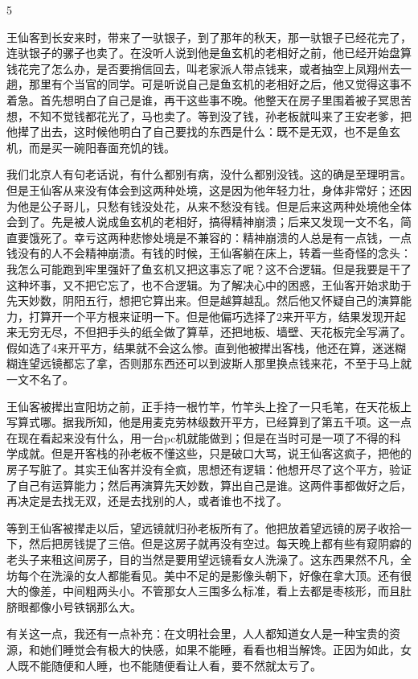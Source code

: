 5 

王仙客到长安来时，带来了一驮银子，到了那年的秋天，那一驮银子已经花完了，连驮银子的骡子也卖了。在没听人说到他是鱼玄机的老相好之前，他已经开始盘算钱花完了怎么办，是否要捎信回去，叫老家派人带点钱来，或者抽空上凤翔州去一趟，那里有个当官的同学。可是听说自己是鱼玄机的老相好之后，他又觉得这事不着急。首先想明白了自己是谁，再干这些事不晚。他整天在房子里围着被子冥思苦想，不知不觉钱都花光了，马也卖了。等到没了钱，孙老板就叫来了王安老爹，把他撵了出去，这时候他明白了自己要找的东西是什么：既不是无双，也不是鱼玄机，而是买一碗阳春面充饥的钱。 

我们北京人有句老话说，有什么都别有病，没什么都别没钱。这的确是至理明言。但是王仙客从来没有体会到这两种处境，这是因为他年轻力壮，身体非常好；还因为他是公子哥儿，只愁有钱没处花，从来不愁没有钱。但是后来这两种处境他全体会到了。先是被人说成鱼玄机的老相好，搞得精神崩溃；后来又发现一文不名，简直要饿死了。幸亏这两种悲惨处境是不兼容的：精神崩溃的人总是有一点钱，一点钱没有的人不会精神崩溃。有钱的时候，王仙客躺在床上，转着一些奇怪的念头：我怎么可能跑到牢里强奸了鱼玄机又把这事忘了呢？这不合逻辑。但是我要是干了这种坏事，又不把它忘了，也不合逻辑。为了解决心中的困惑，王仙客开始求助于先天妙数，阴阳五行，想把它算出来。但是越算越乱。然后他又怀疑自己的演算能力，打算开一个平方根来证明一下。但是他偏巧选择了2来开平方，结果发现开起来无穷无尽，不但把手头的纸全做了算草，还把地板、墙壁、天花板完全写满了。假如选了4来开平方，结果就不会这么惨。直到他被撵出客栈，他还在算，迷迷糊糊连望远镜都忘了拿，否则那东西还可以到波斯人那里换点钱来花，不至于马上就一文不名了。 

王仙客被撵出宣阳坊之前，正手持一根竹竿，竹竿头上拴了一只毛笔，在天花板上写算式哪。据我所知，他是用麦克劳林级数开平方，已经算到了第五千项。这一点在现在看起来没有什么，用一台pc机就能做到；但是在当时可是一项了不得的科学成就。但是开客栈的孙老板不懂这些，只是破口大骂，说王仙客这疯子，把他的房子写脏了。其实王仙客并没有全疯，思想还有逻辑：他想开尽了这个平方，验证了自己有运算能力；然后再演算先天妙数，算出自己是谁。这两件事都做好之后，再决定是去找无双，还是去找别的人，或者谁也不找了。 

等到王仙客被撵走以后，望远镜就归孙老板所有了。他把放着望远镜的房子收拾一下，然后把房钱提了三倍。但是这房子就再没有空过。每天晚上都有些有窥阴癖的老头子来租这间房子，目的当然是要用望远镜看女人洗澡了。这东西果然不凡，全坊每个在洗澡的女人都能看见。美中不足的是影像头朝下，好像在拿大顶。还有很大的像差，中间粗两头小。不管那女人三围多么标准，看上去都是枣核形，而且肚脐眼都像小号铁锅那么大。 

有关这一点，我还有一点补充：在文明社会里，人人都知道女人是一种宝贵的资源，和她们睡觉会有极大的快感，如果不能睡，看看也相当解馋。正因为如此，女人既不能随便和人睡，也不能随便看让人看，要不然就太亏了。 

